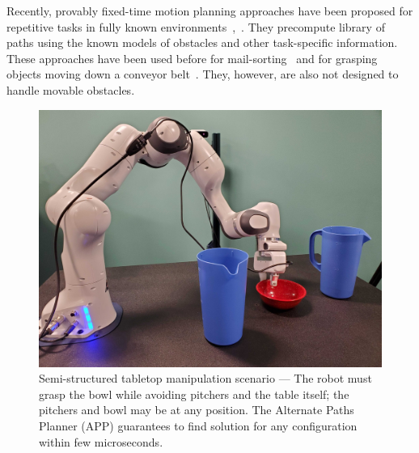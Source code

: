 \documentclass[a4paper]{report}
\begin{document}
Recently, provably fixed-time motion planning approaches have been proposed for repetitive tasks in fully known environments~\cite{islam2019provable},~\cite{islam2020provably}. They precompute library of paths using the known models of obstacles and other task-specific information. These approaches have been used before for mail-sorting~\cite{islam2019provable} and for grasping objects moving down a conveyor belt~\cite{islam2020provably}. They, however, are also not designed to handle movable obstacles.

\begin{figure}[bt]
\centering
\includegraphics[width=\columnwidth]{figs/cover.jpg}
\caption{Semi-structured tabletop manipulation scenario --- The robot must grasp the bowl while avoiding pitchers and the table itself; the pitchers and bowl may be at any position. The Alternate Paths Planner (APP) guarantees to find solution for any configuration within few microseconds.}
\label{fig:cover}
\vskip -0.5cm
\end{figure}
\end{document}
